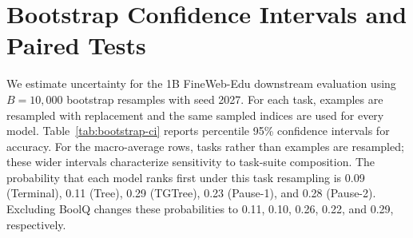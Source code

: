 \documentclass[11pt]{article}
\begin{document}
\section{Bootstrap Confidence Intervals and Paired Tests}
\label{sec:bootstrap}

We estimate uncertainty for the 1B FineWeb-Edu downstream evaluation using $B=10{,}000$ bootstrap resamples with seed 2027. For each task, examples are resampled with replacement and the same sampled indices are used for every model. Table~\ref{tab:bootstrap-ci} reports percentile 95\% confidence intervals for accuracy. For the macro-average rows, tasks rather than examples are resampled; these wider intervals characterize sensitivity to task-suite composition. The probability that each model ranks first under this task resampling is 0.09 (Terminal), 0.11 (Tree), 0.29 (TGTree), 0.23 (Pause-1), and 0.28 (Pause-2). Excluding BoolQ changes these probabilities to 0.11, 0.10, 0.26, 0.22, and 0.29, respectively.
\end{document}
